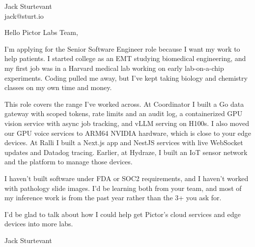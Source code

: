 \documentclass[11pt]{article}
\begin{document}
\raggedright

{\namefont\fontsize{20pt}{24pt}\selectfont Jack Sturtevant}\\[-0.3em]
jack@sturt.io

\vspace{1.2em}

Hello Pictor Labs Team,

I'm applying for the Senior Software Engineer role because I want my work to help patients. I started college as an EMT studying biomedical engineering, and my first job was in a Harvard medical lab working on early lab-on-a-chip experiments. Coding pulled me away, but I've kept taking biology and chemistry classes on my own time and money.

This role covers the range I've worked across. At Coordinator I built a Go data gateway with scoped tokens, rate limits and an audit log, a containerized GPU vision service with async job tracking, and vLLM serving on H100s. I also moved our GPU voice services to ARM64 NVIDIA hardware, which is close to your edge devices. At Ralli I built a Next.js app and NestJS services with live WebSocket updates and Datadog tracing. Earlier, at Hydraze, I built an IoT sensor network and the platform to manage those devices.

I haven't built software under FDA or SOC2 requirements, and I haven't worked with pathology slide images. I'd be learning both from your team, and most of my inference work is from the past year rather than the 3+ you ask for.

I'd be glad to talk about how I could help get Pictor's cloud services and edge devices into more labs.

\vspace{0.6em}
Jack Sturtevant
\end{document}
